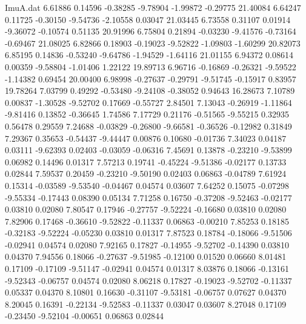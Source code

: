 \begin{filecontents}{ImuA.dat}
   6.61886    0.14596   -0.38285   -9.78904   -1.99872   -0.29775   21.40084
   6.64247    0.11725   -0.30150   -9.54736   -2.10558    0.03047   21.03445
   6.73558    0.31107    0.01914   -9.36072   -0.10574    0.51135   20.91996
   6.75804    0.21894   -0.03230   -9.41576   -0.73164   -0.69467   21.08025
   6.82866    0.18903   -0.19023   -9.52822   -1.09803   -1.60299   20.82073
   6.85195    0.14836   -0.53240   -9.64786   -1.94529   -1.64116   21.01155
   6.94372    0.08614    0.00359   -9.58804   -1.01406    1.22122   19.89713
   6.96716   -0.16869   -0.26321   -9.59522   -1.14382    0.69454   20.00400
   6.98998   -0.27637   -0.29791   -9.51745   -0.15917    0.83957   19.78264
   7.03799    0.49292   -0.53480   -9.24108   -0.38052    0.94643   16.28673
   7.10789    0.00837   -1.30528   -9.52702    0.17669   -0.55727    2.84501
   7.13043   -0.26919   -1.11864   -9.81416    0.13852   -0.36645    1.74586
   7.17729    0.21176   -0.51565   -9.55215    0.32935    0.56478    0.29559
   7.24688   -0.03829   -0.26800   -9.66581   -0.36526   -0.12982    0.31849
   7.29367    0.35653   -0.54437   -9.44447    0.00876    0.10680   -0.01736
   7.34023    0.04187    0.03111   -9.62393    0.02403   -0.03059   -0.06316
   7.45691    0.13878   -0.23210   -9.53899    0.06982    0.14496    0.01317
   7.57213    0.19741   -0.45224   -9.51386   -0.02177    0.13733    0.02844
   7.59537    0.20459   -0.23210   -9.50190    0.02403    0.06863   -0.04789
   7.61924    0.15314   -0.03589   -9.53540   -0.04467    0.04574    0.03607
   7.64252    0.15075   -0.07298   -9.55334   -0.17443    0.08390    0.05134
   7.71258    0.16750   -0.37208   -9.52463   -0.02177    0.03810    0.02080
   7.80547    0.17946   -0.27757   -9.52224   -0.16680    0.03810    0.02080
   7.82906    0.17468   -0.36610   -9.52822   -0.11337    0.06863   -0.00210
   7.85253    0.18185   -0.32183   -9.52224   -0.05230    0.03810    0.01317
   7.87523    0.18784   -0.18066   -9.51506   -0.02941    0.04574    0.02080
   7.92165    0.17827   -0.14955   -9.52702   -0.14390    0.03810    0.04370
   7.94556    0.18066   -0.27637   -9.51985   -0.12100    0.01520    0.06660
   8.01481    0.17109   -0.17109   -9.51147   -0.02941    0.04574    0.01317
   8.03876    0.18066   -0.13161   -9.52343   -0.06757    0.04574    0.02080
   8.06218    0.17827   -0.19023   -9.52702   -0.11337    0.05337    0.04370
   8.10801    0.16630   -0.31107   -9.53181   -0.06757    0.07627    0.04370
   8.20045    0.16391   -0.22134   -9.52583   -0.11337    0.03047    0.03607
   8.27048    0.17109   -0.23450   -9.52104   -0.00651    0.06863    0.02844

\end{filecontents}
